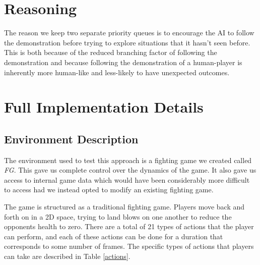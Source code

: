 \section{Reasoning}

The reason we keep two separate priority queues is to encourage the AI to follow the demonstration before trying to explore situations that it hasn't seen before. This is both because of the reduced branching factor of following the demonstration and because following the demonstration of a human-player is inherently more human-like and less-likely to have unexpected outcomes.



\section{Full Implementation Details}

\subsection{Environment Description}
The environment used to test this approach is a fighting game we created called \textit{FG}. This gave us complete control over the dynamics of the game. It also gave us access to internal game data which would have been considerably more difficult to access had we instead opted to modify an existing fighting game. 

The game is structured as a traditional fighting game. Players move back and forth on in a 2D space, trying to land blows on one another to reduce the opponents health to zero. There are a total of 21 types of actions that the player can perform, and each of these actions can be done for a duration that corresponds to some number of frames. The specific types of actions that players can take are described in Table \ref{actions}.

